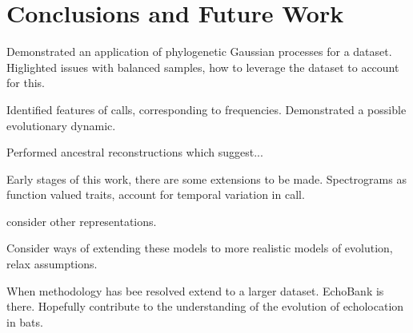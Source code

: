 \documentclass[wsdraft]{ws-rv9x6} %
\begin{document}
\section{Conclusions and Future Work}

Demonstrated an application of phylogenetic Gaussian processes for a dataset. Higlighted issues with balanced samples, how to leverage the dataset to account for this. 

Identified features of calls, corresponding to frequencies. Demonstrated a possible evolutionary dynamic. 

Performed ancestral reconstructions which suggest...

Early stages of this work, there are some extensions to be made. Spectrograms as function valued traits, account for temporal variation in call.

consider other representations.

Consider ways of extending these models to more realistic models of evolution, relax assumptions.

When methodology has bee resolved extend to a larger dataset. EchoBank is there. Hopefully contribute to the understanding of the evolution of echolocation in bats.




\end{document}
